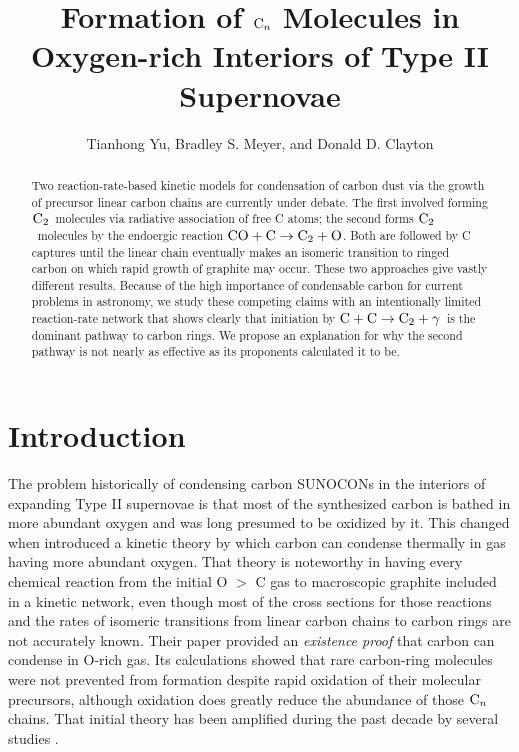 \documentclass[manuscript]{aastex}
\newcommand{\ctwo}{{\rm C}_2}
\newcommand{\cenn}{{\rm C}_n}
\newcommand{\twoctoctwo}{${\rm C} + {\rm C} \to \ctwo + \gamma$}
\newcommand{\coctoctwo}{${\rm CO} + {\rm C} \to \ctwo + {\rm O}$}
\begin{document}
\title{Formation of $\cenn$ Molecules in Oxygen-rich Interiors of Type II
Supernovae}

\author{Tianhong Yu, Bradley S. Meyer, and Donald D. Clayton}

\begin{abstract}
Two reaction-rate-based kinetic models for condensation of carbon dust via the
growth of precursor linear carbon chains are currently under debate. The first
involved forming $\ctwo$\ molecules via radiative association of free C
atoms; the second forms $\ctwo$\ molecules by the endoergic reaction
\coctoctwo. Both are
followed by C captures until the linear chain eventually makes an isomeric
transition to ringed carbon on which rapid growth of graphite may occur.
These two approaches give vastly different results. Because of the high
importance of condensable carbon for current problems in astronomy,
we study these competing claims with an intentionally limited reaction-rate
network that shows clearly that initiation by
\twoctoctwo\ is the dominant
pathway to carbon rings. We propose an explanation for why the second pathway
is not nearly as effective as its proponents calculated it to be.
\end{abstract}


\section{Introduction}

The problem historically of condensing carbon SUNOCONs in the interiors of
expanding Type II supernovae is that most of the synthesized carbon is bathed
in more abundant oxygen and was long presumed to be oxidized by it. This
changed when \citet{1999Sci...283.1290C} introduced a kinetic theory by
which carbon can condense thermally in gas having more abundant oxygen.
That theory is noteworthy in having every chemical reaction from the initial
O $>$ C gas to macroscopic graphite included in a kinetic network, even though
most of the cross sections for those reactions and the rates of isomeric
transitions from linear carbon chains to carbon rings are not accurately known.
Their paper provided an {\em existence proof}
that carbon can condense in O-rich gas.
Its calculations showed that rare carbon-ring molecules were not prevented from
formation despite rapid oxidation of their molecular precursors, although
oxidation does greatly reduce the abundance of those $\cenn$ chains.
That initial
theory has been amplified during the past decade by several studies
\citep{2001ApJ...562..480C,2003ApJ...594..312D,2006ApJ...638..234D,
2009ApJ...703..642C,2010ApJ...713....1C,2011NewAR..55..155C,
2013ApJ...762....5C}.
\end{document}
